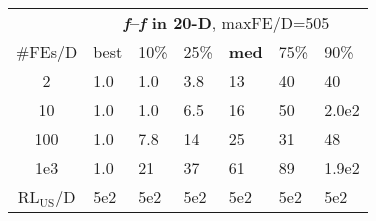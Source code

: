 \begin{tabular}{c|llllll}
 & \multicolumn{6}{|c}{\textbf{\textit{f}\raisebox{-0.35ex}{1}--\textit{f}\raisebox{-0.35ex}{24} in 20-D}, maxFE/D=505}\\
\#FEs/D & best & 10\% & 25\% & \textbf{med} & 75\% & 90\%\\
2 & \hspace*{1ex}1.0 & \hspace*{1ex}1.0 & \hspace*{1ex}3.8 & 13 & 40 & 40\\
10 & \hspace*{1ex}1.0 & \hspace*{1ex}1.0 & \hspace*{1ex}6.5 & 16 & 50 & 2.0e2\\
100 & \hspace*{1ex}1.0 & \hspace*{1ex}7.8 & 14 & 25 & 31 & 48\\
1e3 & \hspace*{1ex}1.0 & 21 & 37 & 61 & 89 & 1.9e2\\
$\text{RL}_{\text{US}}$/D & 5e2 & 5e2 & 5e2 & 5e2 & 5e2 & 5e2
\end{tabular}
